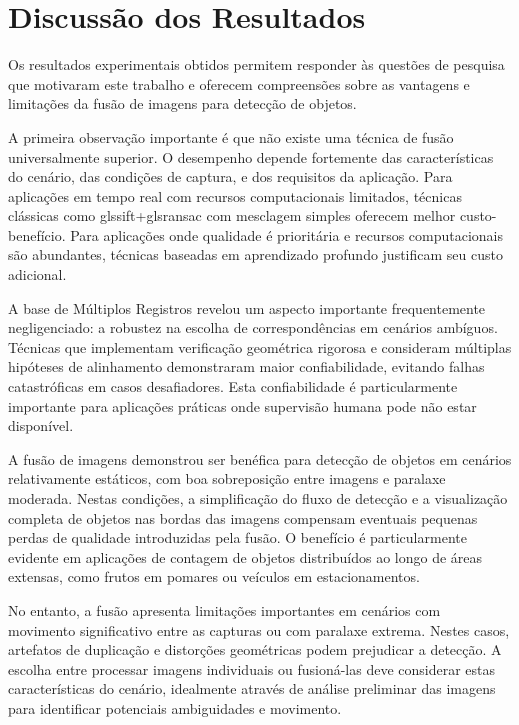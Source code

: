 \section{Discussão dos Resultados}

Os resultados experimentais obtidos permitem responder às questões de pesquisa que motivaram este trabalho e oferecem compreensões sobre as vantagens e limitações da fusão de imagens para detecção de objetos.

A primeira observação importante é que não existe uma técnica de fusão universalmente superior. O desempenho depende fortemente das características do cenário, das condições de captura, e dos requisitos da aplicação. Para aplicações em tempo real com recursos computacionais limitados, técnicas clássicas como gls{sift}+gls{ransac} com mesclagem simples oferecem melhor custo-benefício. Para aplicações onde qualidade é prioritária e recursos computacionais são abundantes, técnicas baseadas em aprendizado profundo justificam seu custo adicional.

A base de Múltiplos Registros revelou um aspecto importante frequentemente negligenciado: a robustez na escolha de correspondências em cenários ambíguos. Técnicas que implementam verificação geométrica rigorosa e consideram múltiplas hipóteses de alinhamento demonstraram maior confiabilidade, evitando falhas catastróficas em casos desafiadores. Esta confiabilidade é particularmente importante para aplicações práticas onde supervisão humana pode não estar disponível.

A fusão de imagens demonstrou ser benéfica para detecção de objetos em cenários relativamente estáticos, com boa sobreposição entre imagens e paralaxe moderada. Nestas condições, a simplificação do fluxo de detecção e a visualização completa de objetos nas bordas das imagens compensam eventuais pequenas perdas de qualidade introduzidas pela fusão. O benefício é particularmente evidente em aplicações de contagem de objetos distribuídos ao longo de áreas extensas, como frutos em pomares ou veículos em estacionamentos.

No entanto, a fusão apresenta limitações importantes em cenários com movimento significativo entre as capturas ou com paralaxe extrema. Nestes casos, artefatos de duplicação e distorções geométricas podem prejudicar a detecção. A escolha entre processar imagens individuais ou fusioná-las deve considerar estas características do cenário, idealmente através de análise preliminar das imagens para identificar potenciais ambiguidades e movimento.

